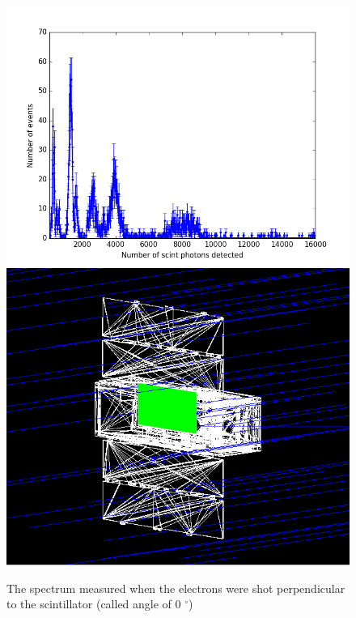 \documentclass[12pt, a4paper,titlepage]{article}
\numberwithin{equation}{section}
\numberwithin{figure}{section}
\begin{document}
\begin{figure}[h!]
\centering %
\includegraphics[width=.55\textwidth,origin=c,angle=0]{images/electrons0degspectra.png}
\qquad
\includegraphics[width=.4\textwidth,origin=c,angle=90]{images/0mac.png} 
\caption{\label{fig:i} The spectrum measured when the electrons were shot perpendicular to the scintillator (called angle of 0 $^{\circ}$)}
\end{figure}
\end{document}
